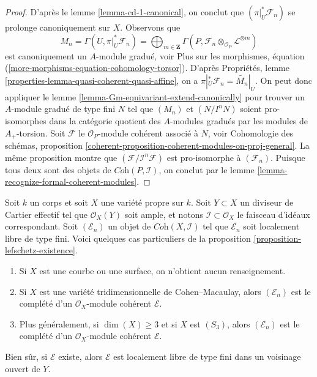 \begin{proof}
\medskip\noindent
D'après le lemme \ref{lemma-cd-1-canonical}, on conclut que
$(\pi|_U^*\mathcal{F}_n)$ se prolonge canoniquement sur $X$.
Observons que
$$
M_n = \Gamma(U, \pi|_U^*\mathcal{F}_n) =
\bigoplus\nolimits_{m \in \mathbf{Z}}
\Gamma(P, \mathcal{F}_n \otimes_{\mathcal{O}_P} \mathcal{L}^{\otimes m})
$$
est canoniquement un $A$-module gradué, voir
Plus sur les morphismes, équation (\ref{more-morphisms-equation-cohomology-torsor}).
D'après Propriétés, lemme \ref{properties-lemma-quasi-coherent-quasi-affine},
on a $\pi|_U^*\mathcal{F}_n = \widetilde{M_n}|_U$.
On peut donc appliquer le lemme \ref{lemma-Gm-equivariant-extend-canonically}
pour trouver un $A$-module gradué de type fini $N$ tel que
$(M_n)$ et $(N/I^nN)$ soient pro-isomorphes dans la catégorie quotient
des $A$-modules gradués par les modules de $A_+$-torsion.
Soit $\mathcal{F}$ le $\mathcal{O}_P$-module cohérent
associé à $N$, voir
Cohomologie des schémas, proposition
\ref{coherent-proposition-coherent-modules-on-proj-general}.
La même proposition montre que $(\mathcal{F}/\mathcal{I}^n\mathcal{F})$
est pro-isomorphe à $(\mathcal{F}_n)$.
Puisque tous deux sont des objets de $\textit{Coh}(P, \mathcal{I})$,
on conclut par le lemme \ref{lemma-recognize-formal-coherent-modules}.
\end{proof}

\begin{example}
\label{example-lefschetz-existence}
Soit $k$ un corps et soit $X$ une variété propre sur $k$.
Soit $Y \subset X$ un diviseur de Cartier effectif tel que
$\mathcal{O}_X(Y)$ soit ample, et notons
$\mathcal{I} \subset \mathcal{O}_X$ le faisceau d'idéaux
correspondant. Soit $(\mathcal{E}_n)$ un objet
de $\textit{Coh}(X, \mathcal{I})$ tel que $\mathcal{E}_n$ soit
localement libre de type fini.
Voici quelques cas particuliers de la
proposition \ref{proposition-lefschetz-existence}.
\begin{enumerate}
\item Si $X$ est une courbe ou une surface, on n'obtient aucun renseignement.
\item Si $X$ est une variété tridimensionnelle de Cohen--Macaulay, alors
$(\mathcal{E}_n)$ est le complété d'un
$\mathcal{O}_X$-module cohérent $\mathcal{E}$.
\item Plus généralement, si $\dim(X) \geq 3$ et si $X$ est $(S_3)$, alors
$(\mathcal{E}_n)$ est le complété d'un
$\mathcal{O}_X$-module cohérent $\mathcal{E}$.
\end{enumerate}
Bien sûr, si $\mathcal{E}$ existe, alors $\mathcal{E}$ est localement libre
de type fini dans un voisinage ouvert de $Y$.
\end{example}

